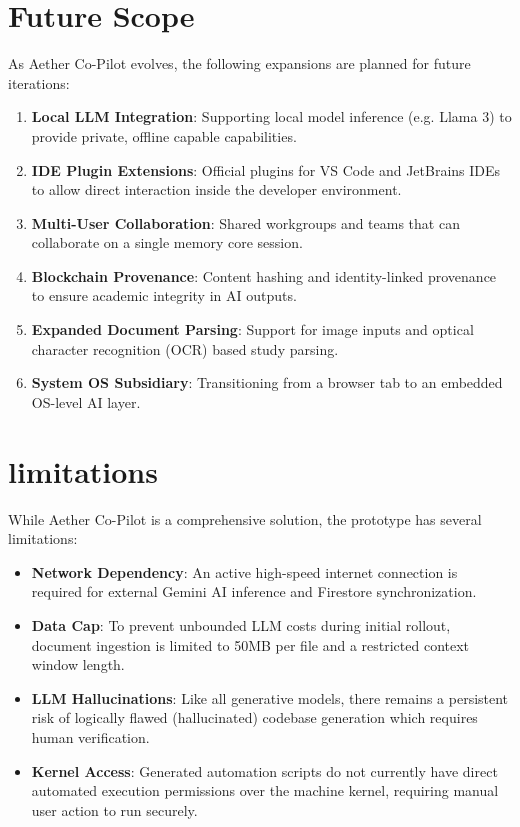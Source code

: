 \section{Future Scope}
As Aether Co-Pilot evolves, the following expansions are planned for future iterations:
\begin{enumerate}
    \item \textbf{Local LLM Integration}: Supporting local model inference (e.g. Llama 3) to provide private, offline capable capabilities.
    \item \textbf{IDE Plugin Extensions}: Official plugins for VS Code and JetBrains IDEs to allow direct interaction inside the developer environment.
    \item \textbf{Multi-User Collaboration}: Shared workgroups and teams that can collaborate on a single memory core session.
    \item \textbf{Blockchain Provenance}: Content hashing and identity-linked provenance to ensure academic integrity in AI outputs.
    \item \textbf{Expanded Document Parsing}: Support for image inputs and optical character recognition (OCR) based study parsing.
    \item \textbf{System OS Subsidiary}: Transitioning from a browser tab to an embedded OS-level AI layer.
\end{enumerate}

\section{limitations}
While Aether Co-Pilot is a comprehensive solution, the prototype has several limitations:
\begin{itemize}
    \item \textbf{Network Dependency}: An active high-speed internet connection is required for external Gemini AI inference and Firestore synchronization.
    \item \textbf{Data Cap}: To prevent unbounded LLM costs during initial rollout, document ingestion is limited to 50MB per file and a restricted context window length.
    \item \textbf{LLM Hallucinations}: Like all generative models, there remains a persistent risk of logically flawed (hallucinated) codebase generation which requires human verification.
    \item \textbf{Kernel Access}: Generated automation scripts do not currently have direct automated execution permissions over the machine kernel, requiring manual user action to run securely.
\end{itemize}

\newpage
